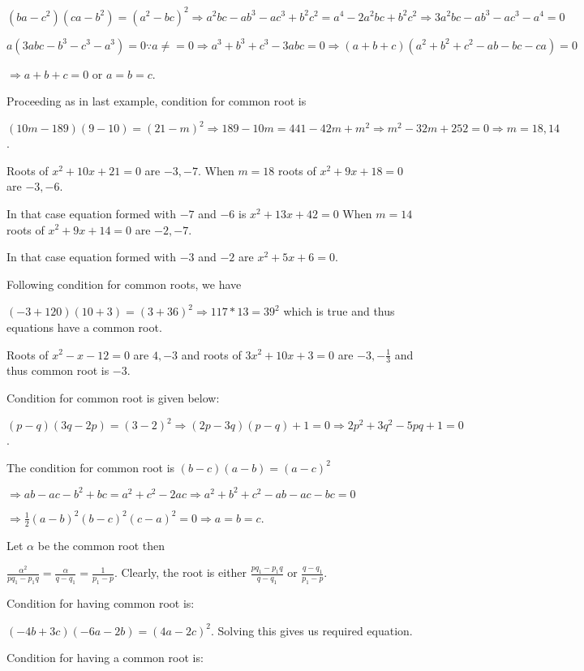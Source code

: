   $(ba - c^2)(ca - b^2) = (a^2 - bc)^2\Rightarrow a^2bc - ab^3 - ac^3 + b^2c^2 = a^4 - 2a^2bc +
  b^2c^2\Rightarrow 3a^2bc - ab^3 -ac^3 - a^4 = 0$

  $a(3abc - b^3 - c^3 - a^3) = 0\because a\ne = 0 \Rightarrow a^3 + b^3 + c^3 - 3abc = 0\Rightarrow (a + b +
  c)(a^2 + b^2 + c^2 - ab - bc - ca) = 0$

  $\Rightarrow a + b + c = 0$ or $a = b = c$.
\item Proceeding as in last example, condition for common root is

  $(10m - 189)(9 - 10) = (21 - m)^2\Rightarrow 189 - 10m = 441 - 42m + m^2 \Rightarrow m^2 - 32m + 252 = 0
  \Rightarrow m = 18, 14$.

  Roots of $x^2 + 10x + 21 = 0$ are $-3, -7$. When $m = 18$ roots of $x^2 + 9x + 18 = 0$ are $-3, -6$.

  In that case equation formed with $-7$ and $-6$ is $x^2 + 13x + 42 = 0$ When $m= 14$ roots of $x^2 + 9x
  + 14 = 0$ are $-2, -7$.

  In that case equation formed with $-3$ and $-2$ are $x^2 + 5x + 6 = 0$.
\item Following condition for common roots, we have

  $(-3 + 120)(10 + 3) = (3 + 36)^2\Rightarrow 117 * 13 = 39^2$ which is true and thus equations have a
  common root.

  Roots of $x^2 - x - 12 = 0$ are $4, -3$ and roots of $3x^2 + 10x + 3 = 0$ are $-3, -\frac{1}{3}$ and thus
  common root is $-3$.
\item Condition for common root is given below:

  $(p - q)(3q - 2p) = (3 - 2)^2\Rightarrow (2p - 3q)(p - q) + 1 = 0\Rightarrow 2p^2 + 3q^2 - 5pq + 1 = 0$.
\item The condition for common root is $(b - c)(a - b) =  (a - c)^2$

  $\Rightarrow ab - ac - b^2 + bc = a^2 + c^2 - 2ac\Rightarrow a^2 + b^2 + c^2 - ab - ac - bc = 0$

  $\Rightarrow \frac{1}{2}(a - b)^2(b - c)^2(c - a)^2 = 0\Rightarrow a = b = c$.
\item Let $\alpha$ be the common root then

  $\frac{\alpha^2}{pq_1 - p_1q} = \frac{\alpha}{q - q_1} = \frac{1}{p_1 - p}$. Clearly, the root is either
  $\frac{pq_1 - p_1q}{q - q_1}$ or $\frac{q - q_1}{p_1 - p}$.
\item Condition for having common root is:

  $(-4b + 3c)(-6a - 2b) = (4a - 2c)^2$. Solving this gives us required equation.
\item Condition for having a common root is:

